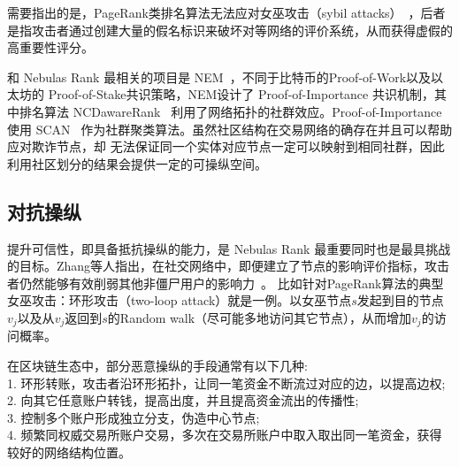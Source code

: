 需要指出的是，PageRank类排名算法无法应对女巫攻击（sybil attacks）~\cite{cheng2006manipulability}，后者是指攻击者通过创建大量的假名标识来破坏对等网络的评价系统，从而获得虚假的高重要性评分。


和 Nebulas Rank 最相关的项目是 NEM~\cite{nem}，不同于比特币的Proof-of-Work以及以太坊的 Proof-of-Stake共识策略，NEM设计了 Proof-of-Importance 共识机制，其中排名算法 NCDawareRank ~\cite{Nikolakopoulos2013}利用了网络拓扑的社群效应。Proof-of-Importance 使用 SCAN ~\cite{xu2007scan}\cite{shiokawa2015scan}\cite{chang2017mathsf}作为社群聚类算法。虽然社区结构在交易网络的确存在并且可以帮助应对欺诈节点，却 无法保证同一个实体对应节点一定可以映射到相同社群，因此利用社区划分的结果会提供一定的可操纵空间。


\subsection{对抗操纵}
提升可信性，即具备抵抗操纵的能力，是 Nebulas Rank 最重要同时也是最具挑战的目标。Zhang等人指出，在社交网络中，即便建立了节点的影响评价指标，攻击者仍然能够有效削弱其他非僵尸用户的影响力~\cite{zhang2016truetop}。
比如针对PageRank算法的典型女巫攻击：环形攻击（two-loop attack）就是一例。以女巫节点$s$发起到目的节点
$v_j$以及从$v_j$返回到$s$的Random walk（尽可能多地访问其它节点），从而增加$v_j$的访问概率。


在区块链生态中，部分恶意操纵的手段通常有以下几种:\\
1. 环形转账，攻击者沿环形拓扑，让同一笔资金不断流过对应的边，以提高边权;\\
2. 向其它任意账户转钱，提高出度，并且提高资金流出的传播性;\\
3. 控制多个账户形成独立分支，伪造中心节点;\\
4. 频繁同权威交易所账户交易，多次在交易所账户中取入取出同一笔资金，获得较好的网络结构位置。\\




